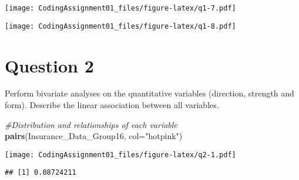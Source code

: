 \documentclass[
]{article}
\newenvironment{Shaded}{\begin{snugshade}}{\end{snugshade}}
\newcommand{\AttributeTok}[1]{\textcolor[rgb]{0.13,0.29,0.53}{#1}}
\newcommand{\CommentTok}[1]{\textcolor[rgb]{0.56,0.35,0.01}{\textit{#1}}}
\newcommand{\FunctionTok}[1]{\textcolor[rgb]{0.13,0.29,0.53}{\textbf{#1}}}
\newcommand{\NormalTok}[1]{#1}
\newcommand{\SpecialCharTok}[1]{\textcolor[rgb]{0.81,0.36,0.00}{\textbf{#1}}}
\newcommand{\StringTok}[1]{\textcolor[rgb]{0.31,0.60,0.02}{#1}}
\begin{document}
\begin{Shaded}
\end{Shaded}

\texttt{[image: CodingAssignment01\_files/figure-latex/q1-7.pdf]}

\begin{Shaded}
\end{Shaded}

\texttt{[image: CodingAssignment01\_files/figure-latex/q1-8.pdf]}

\hypertarget{question-2}{%
\section{Question 2}\label{question-2}}

Perform bivariate analyses on the quantitative variables (direction,
strength and form). Describe the linear association between all
variables.

\begin{Shaded}
\begin{Highlighting}[]
\CommentTok{\#Distribution and relationships of each variable}
\FunctionTok{pairs}\NormalTok{(Insurance\_Data\_Group16, }\AttributeTok{col=}\StringTok{"hotpink"}\NormalTok{)}
\end{Highlighting}
\end{Shaded}

\texttt{[image: CodingAssignment01\_files/figure-latex/q2-1.pdf]}

\begin{Shaded}
\end{Shaded}

\begin{verbatim}
## [1] 0.08724211
\end{verbatim}
\end{document}
